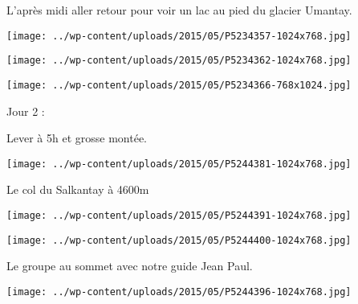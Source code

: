  

 L'après midi aller retour pour voir un lac au pied du glacier Umantay. 

 

\begin{center} \texttt{[image: ../wp-content/uploads/2015/05/P5234357-1024x768.jpg]} \end{center}

 

 

\begin{center} \texttt{[image: ../wp-content/uploads/2015/05/P5234362-1024x768.jpg]} \end{center}

 

 

\begin{center} \texttt{[image: ../wp-content/uploads/2015/05/P5234366-768x1024.jpg]} \end{center}

 

 Jour 2 : 

 Lever à 5h et grosse montée. 

 

\begin{center} \texttt{[image: ../wp-content/uploads/2015/05/P5244381-1024x768.jpg]} \end{center}

 

 Le col du Salkantay à 4600m 

 

\begin{center} \texttt{[image: ../wp-content/uploads/2015/05/P5244391-1024x768.jpg]} \end{center}

 

 

\begin{center} \texttt{[image: ../wp-content/uploads/2015/05/P5244400-1024x768.jpg]} \end{center}

 

 Le groupe au sommet avec notre guide Jean Paul. 

 

\begin{center} \texttt{[image: ../wp-content/uploads/2015/05/P5244396-1024x768.jpg]} \end{center}

